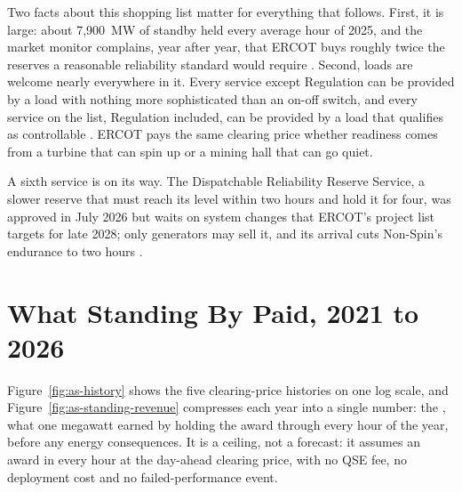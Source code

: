 Two facts about this shopping list matter for everything that follows. First, it is large: about 7,900~MW of standby held every average hour of 2025, and the market monitor complains, year after year, that ERCOT buys roughly twice the reserves a reasonable reliability standard would require \autocite{ercotasmeth2025,potomac2026somercot}. %
Second, loads are welcome nearly everywhere in it. Every service except Regulation can be provided by a load with nothing more sophisticated than an on-off switch, and every service on the list, Regulation included, can be provided by a load that qualifies as controllable \autocite{ercot2026protocols}. %
ERCOT pays the same clearing price whether readiness comes from a turbine that can spin up or a mining hall that can go quiet.

A sixth service is on its way. The Dispatchable Reliability Reserve Service, a slower reserve that must reach its level within two hours and hold it for four, was approved in July 2026 but waits on system changes that ERCOT's project list targets for late 2028; only generators may sell it, and its arrival cuts Non-Spin's endurance to two hours \autocite{ercot2026nprr1309,ercot2026rrprojects}. %

\section{What Standing By Paid, 2021 to 2026}

Figure~\ref{fig:as-history} shows the five clearing-price histories on one log scale, and Figure~\ref{fig:as-standing-revenue} compresses each year into a single number: the , what one megawatt earned by holding the award through every hour of the year, before any energy consequences. It is a ceiling, not a forecast: it assumes an award in every hour at the day-ahead clearing price, with no QSE fee, no deployment cost and no failed-performance event.


